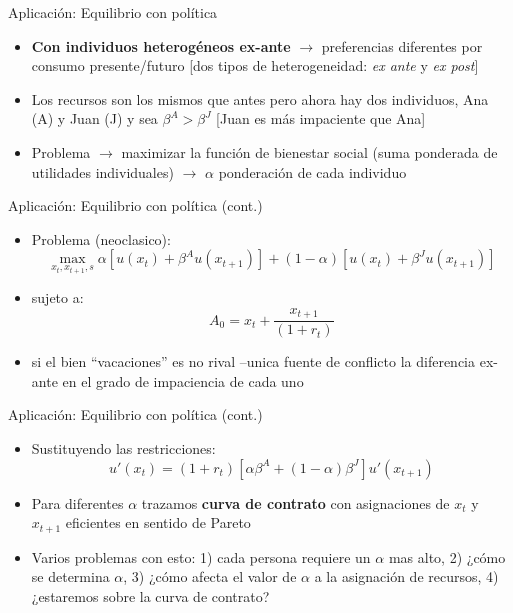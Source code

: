 \documentclass[14pt,aspectratio=169]{beamer}
\begin{document}
\begin{frame}{Aplicación: Equilibrio con política}
  \begin{itemize}
  \item \textbf{Con individuos heterogéneos ex-ante} $\longrightarrow$
    preferencias diferentes por consumo presente/futuro [dos tipos de heterogeneidad: \textit{ex
      ante} y \textit{ex post}]
    \item Los recursos son los mismos que antes pero ahora hay dos
      individuos, Ana (A) y Juan (J) y sea $\beta^{A}>\beta^{J}$ [Juan
      es más impaciente que Ana]
      \item Problema $\longrightarrow$ maximizar la función de
        bienestar social (suma ponderada de utilidades individuales)
        $\longrightarrow$ $\alpha$ ponderación de cada individuo
        
    \end{itemize}

\end{frame}


\begin{frame}{Aplicación: Equilibrio con política (cont.)}
  \begin{itemize}
  \item Problema (neoclasico):
    \begin{equation*}
\max_{x_{t},x_{t+1},s} \alpha\left[u(x_{t})+\beta^{A}u(x_{t+1})\right] + (1-\alpha)\left[u(x_{t})+\beta^{J}u(x_{t+1})\right]
\end{equation*}
\item sujeto a:
  \begin{equation*}
A_{0}=x_{t}+\frac{x_{t+1}}{(1+r_{t})}
\end{equation*}
\item si el bien ``vacaciones'' es no rival --unica fuente de conflicto
  la diferencia ex-ante en el grado de impaciencia de cada uno 
    \end{itemize}

\end{frame}



\begin{frame}{Aplicación: Equilibrio con política (cont.)}
  \begin{itemize}
  \item Sustituyendo las restricciones:
    \begin{equation*}
u'(x_{t})=(1+r_{t})[\alpha \beta^{A}+(1-\alpha)\beta^{J}]u'(x_{t+1})
\end{equation*}
\item Para diferentes $\alpha$ trazamos \textbf{curva de contrato} con
  asignaciones de $x_{t}$ y $x_{t+1}$ eficientes en sentido de Pareto
  \item Varios problemas con esto: 1) cada persona requiere un
    $\alpha$ mas alto, 2) ¿cómo se determina $\alpha$, 3) ¿cómo afecta
    el valor de $\alpha$ a la asignación de recursos, 4) ¿estaremos
    sobre la curva de contrato?
    \end{itemize}

\end{frame}
\end{document}
